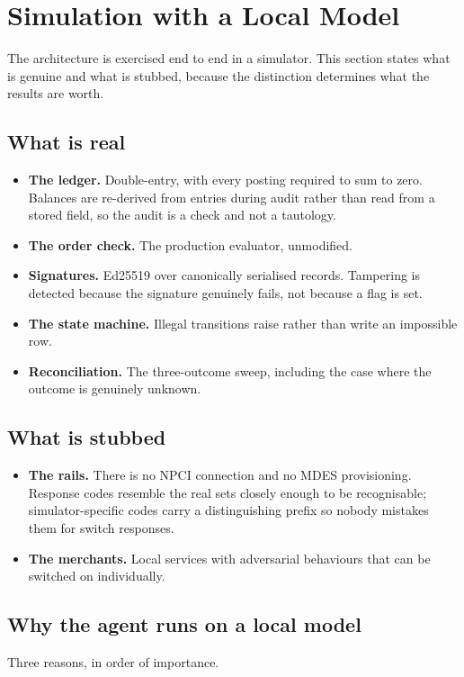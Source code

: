 \documentclass[journal,onecolumn,11pt]{IEEEtran}
\begin{document}
\section{Simulation with a Local Model}\label{sec:sim}
The architecture is exercised end to end in a simulator. This section states what is
genuine and what is stubbed, because the distinction determines what the results are
worth.

\subsection{What is real}
\begin{itemize}[leftmargin=*]
\item \textbf{The ledger.} Double-entry, with every posting required to sum to zero.
Balances are re-derived from entries during audit rather than read from a stored field,
so the audit is a check and not a tautology.
\item \textbf{The order check.} The production evaluator, unmodified.
\item \textbf{Signatures.} Ed25519 over canonically serialised records. Tampering is
detected because the signature genuinely fails, not because a flag is set.
\item \textbf{The state machine.} Illegal transitions raise rather than write an
impossible row.
\item \textbf{Reconciliation.} The three-outcome sweep, including the case where the
outcome is genuinely unknown.
\end{itemize}

\subsection{What is stubbed}
\begin{itemize}[leftmargin=*]
\item \textbf{The rails.} There is no NPCI connection and no MDES provisioning. Response
codes resemble the real sets closely enough to be recognisable; simulator-specific codes
carry a distinguishing prefix so nobody mistakes them for switch responses.
\item \textbf{The merchants.} Local services with adversarial behaviours that can be
switched on individually.
\end{itemize}

\subsection{Why the agent runs on a local model}
Three reasons, in order of importance.
\end{document}
